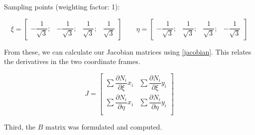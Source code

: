 \documentclass[11pt]{article}
\begin{document}
Sampling points (weighting factor: 1):

\begin{equation}
    \xi = \begin{bmatrix}
        -\dfrac{1}{\sqrt{3}}; &
        -\dfrac{1}{\sqrt{3}}; &
        \dfrac{1}{\sqrt{3}};  &
        \dfrac{1}{\sqrt{3}}
    \end{bmatrix}\qquad \eta = \begin{bmatrix}
        -\dfrac{1}{\sqrt{3}}; &
        \dfrac{1}{\sqrt{3}};  &
        \dfrac{1}{\sqrt{3}};  &
        -\dfrac{1}{\sqrt{3}}
    \end{bmatrix}
\end{equation}

From these, we can calculate our Jacobian matrices using \eqref{jacobian}. This relates the derivatives in the two coordinate frames.

\begin{equation}\label{jacobian}
    J = \begin{bmatrix}
        \sum \dfrac{\partial N_i}{\partial \xi}x_i  & \sum \dfrac{\partial N_i}{\partial \xi}y_i  \\
        \sum \dfrac{\partial N_i}{\partial \eta}x_i & \sum \dfrac{\partial N_i}{\partial \eta}y_i \\
    \end{bmatrix}
\end{equation}

Third, the $B$ matrix was formulated and computed.
\end{document}
